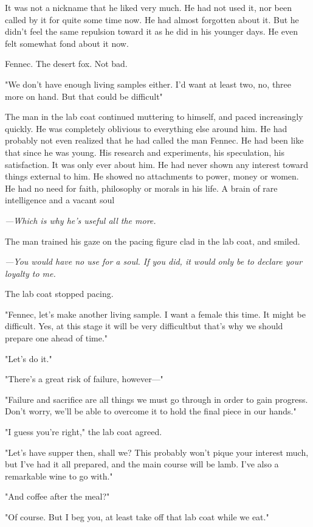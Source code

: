 It was not a nickname that he liked very much. He had not used it, nor
been called by it for quite some time now. He had almost forgotten about
it. But he didn't feel the same repulsion toward it as he did in his
younger days. He even felt somewhat fond about it now.

Fennec. The desert fox. Not bad.

"We don't have enough living samples either. I'd want at least two, no,
three more on hand. But that could be difficult\el "

The man in the lab coat continued muttering to himself, and paced
increasingly quickly. He was completely oblivious to everything else
around him. He had probably not even realized that he had called the man
Fennec. He had been like that since he was young. His research and
experiments, his speculation, his satisfaction. It was only ever about
him. He had never shown any interest toward things external to him. He
showed no attachments to power, money or women. He had no need for
faith, philosophy or morals in his life. A brain of rare intelligence
and a vacant soul\el 

\emph{---Which is why he's useful all the more.}

The man trained his gaze on the pacing figure clad in the lab coat, and
smiled.

\emph{---You would have no use for a soul. If you did, it would only be to
declare your loyalty to me.}

The lab coat stopped pacing.

"Fennec, let's make another living sample. I want a female this time. It
might be difficult. Yes, at this stage it will be very difficult\el but
that's why we should prepare one ahead of time."

"Let's do it."

"There's a great risk of failure, however---"

"Failure and sacrifice are all things we must go through in order to
gain progress. Don't worry, we'll be able to overcome it to hold the
final piece in our hands."

"I guess you're right," the lab coat agreed.

"Let's have supper then, shall we? This probably won't pique your
interest much, but I've had it all prepared, and the main course will be
lamb. I've also a remarkable wine to go with."

"And coffee after the meal?"

"Of course. But I beg you, at least take off that lab coat while we
eat."

